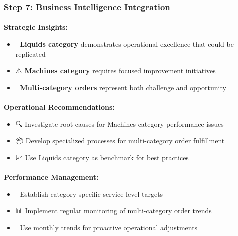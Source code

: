 \documentclass[
  letterpaper,
  DIV=11,
  numbers=noendperiod]{scrartcl}
\makeatletter
\let\oldparagraph\paragraph
\renewcommand{\paragraph}{
    \@ifstar
      \xxxParagraphStar
      \xxxParagraphNoStar
  }
\newcommand{\xxxParagraphStar}[1]{\oldparagraph*{#1}\mbox{}}
\newcommand{\xxxParagraphNoStar}[1]{\oldparagraph{#1}\mbox{}}
\providecommand{\tightlist}{%
  \setlength{\itemsep}{0pt}\setlength{\parskip}{0pt}}
\makeatother
\begin{document}
\subsubsection{\texorpdfstring{\textbf{Step 7: Business Intelligence
Integration}}{Step 7: Business Intelligence Integration}}\label{step-7-business-intelligence-integration}

\paragraph{\texorpdfstring{\textbf{Strategic
Insights:}}{Strategic Insights:}}\label{strategic-insights}

\begin{itemize}
\tightlist
\item
  🎯 \textbf{Liquids category} demonstrates operational excellence that
  could be replicated
\item
  ⚠️ \textbf{Machines category} requires focused improvement initiatives
\item
  🔄 \textbf{Multi-category orders} represent both challenge and
  opportunity
\end{itemize}

\paragraph{\texorpdfstring{\textbf{Operational
Recommendations:}}{Operational Recommendations:}}\label{operational-recommendations}

\begin{itemize}
\tightlist
\item
  🔍 Investigate root causes for Machines category performance issues
\item
  📦 Develop specialized processes for multi-category order fulfillment
\item
  📈 Use Liquids category as benchmark for best practices
\end{itemize}

\paragraph{\texorpdfstring{\textbf{Performance
Management:}}{Performance Management:}}\label{performance-management}

\begin{itemize}
\tightlist
\item
  🎯 Establish category-specific service level targets
\item
  📊 Implement regular monitoring of multi-category order trends
\item
  📅 Use monthly trends for proactive operational adjustments
\end{itemize}
\end{document}
